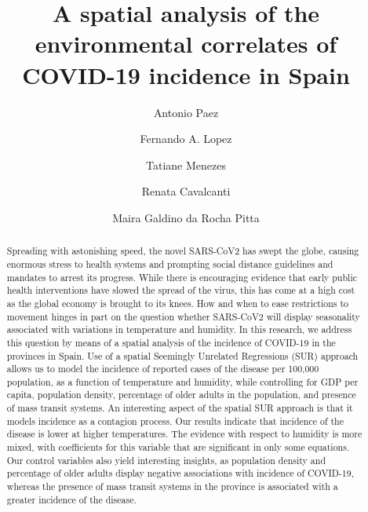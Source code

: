 \documentclass[]{elsarticle} %
\begin{document}
\begin{frontmatter}

  \title{A spatial analysis of the environmental correlates of COVID-19 incidence
in Spain}
    \author[McMaster University]{Antonio Paez}
    \author[Universidad Politecnica de Cartagena]{Fernando A. Lopez}
    \author[Departamento de Economia]{Tatiane Menezes}
    \author[Nucleo de Pesquisa]{Renata Cavalcanti}
    \author[Nucleo de Pesquisa]{Maira Galdino da Rocha Pitta}
      \address[McMaster University]{School of Geography and Earth Sciences, McMaster University, 1281 Main
St W, Hamilton, ON, L8S 4K1, Canada}
    \address[Universidad Politecnica de Cartagena]{Departamento de Metodos Cuantitativos, Ciencias Juridicas, y Lenguas
Modernas, Universidad Politecnica de Cartagena, Calle Real Numero 3,
30201, Cartagena, Murcia, Spain}
    \address[Departamento de Economia]{Departamento de Economia, Universidade Federal de Pernambuco, Av dos
Economistas, s/n - Cidade Universitária, Recife - PE, 50670-901, Brasil}
    \address[Nucleo de Pesquisa]{Núcleo de Pesquisa em Inovação Terapêutica NUPIT / UFPE, Av.
Prof.~Moraes Rego, 1235 - Cidade Universitária, Recife, PE, CEP
50670-901, Brazil}
  
  \begin{abstract}
  Spreading with astonishing speed, the novel SARS-CoV2 has swept the
  globe, causing enormous stress to health systems and prompting social
  distance guidelines and mandates to arrest its progress. While there is
  encouraging evidence that early public health interventions have slowed
  the spread of the virus, this has come at a high cost as the global
  economy is brought to its knees. How and when to ease restrictions to
  movement hinges in part on the question whether SARS-CoV2 will display
  seasonality associated with variations in temperature and humidity. In
  this research, we address this question by means of a spatial analysis
  of the incidence of COVID-19 in the provinces in Spain. Use of a spatial
  Seemingly Unrelated Regressions (SUR) approach allows us to model the
  incidence of reported cases of the disease per 100,000 population, as a
  function of temperature and humidity, while controlling for GDP per
  capita, population density, percentage of older adults in the
  population, and presence of mass transit systems. An interesting aspect
  of the spatial SUR approach is that it models incidence as a contagion
  process. Our results indicate that incidence of the disease is lower at
  higher temperatures. The evidence with respect to humidity is more
  mixed, with coefficients for this variable that are significant in only
  some equations. Our control variables also yield interesting insights,
  as population density and percentage of older adults display negative
  associations with incidence of COVID-19, whereas the presence of mass
  transit systems in the province is associated with a greater incidence
  of the disease.
  \end{abstract}
  
 \end{frontmatter}
\end{document}
